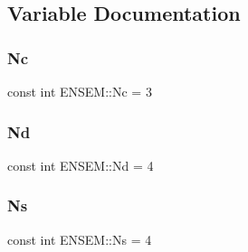 \subsection{Variable Documentation}
\mbox{\label{namespaceENSEM_aabe0c3018e0246aaae1602fa5c08b58a}} 
\subsubsection{\texorpdfstring{Nc}{Nc}}
{\footnotesize\ttfamily const int E\+N\+S\+E\+M\+::\+Nc = 3}

\mbox{\label{namespaceENSEM_a016f024340c6231805f8b73f46b808dc}} 
\subsubsection{\texorpdfstring{Nd}{Nd}}
{\footnotesize\ttfamily const int E\+N\+S\+E\+M\+::\+Nd = 4}

\mbox{\label{namespaceENSEM_a6f05e048f9b2eb1a19131074f8abc25f}} 
\subsubsection{\texorpdfstring{Ns}{Ns}}
{\footnotesize\ttfamily const int E\+N\+S\+E\+M\+::\+Ns = 4}


